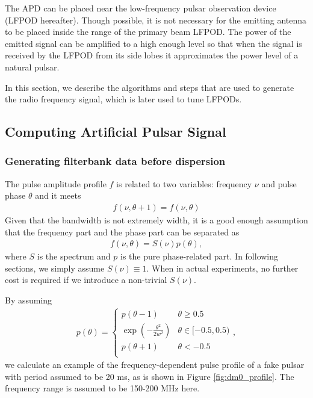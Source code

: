 \documentclass[fleqn,usenatbib]{mnras}
\begin{document}
The APD can be placed near the low-frequency pulsar observation device (LFPOD hereafter). 
Though possible, it is not necessary for the emitting antenna to be placed inside the range of the primary beam LFPOD.
The power of the emitted signal can be amplified to a high enough level so that when the signal is received by the LFPOD from its side lobes it approximates the power level of a natural pulsar.

In this section, we describe the algorithms and steps that are used to generate the radio frequency signal, which is later used to tune LFPODs.

\subsection{Computing Artificial Pulsar Signal}
\subsubsection{Generating filterbank data before dispersion}
The pulse amplitude profile $f$ is related to two variables: frequency $\nu$ and pulse phase $\theta$ and it meets
\begin{gather}
    f(\nu, \theta+1)=f(\nu, \theta)
\end{gather}
Given that the bandwidth is not extremely width, it is a good enough assumption that the frequency part and the phase part can be separated as
\begin{gather}
    f(\nu,\theta)=S(\nu)p(\theta),
\end{gather}
where $S$ is the spectrum and $p$ is the pure phase-related part.
In following sections, we simply assume $S(\nu)\equiv 1$. 
When in actual experiments, no further cost is required if we introduce a non-trivial $S(\nu)$.

By assuming 
\begin{gather}
    p(\theta)=\left \{
    \begin{array}{rl}
        p(\theta-1) &\theta \geq 0.5\\
         \exp(-\frac{\theta^2}{2w^2}) & \theta\in[-0.5, 0.5) \\
        p(\theta+1) &\theta < -0.5\\
    \end{array}
    \right ., 
\end{gather}
we calculate an example of the frequency-dependent pulse profile of a fake pulsar with period assumed to be 20 ms, as is shown in Figure \ref{fig:dm0_profile}. The frequency range is assumed to be 150-200 MHz here.
\end{document}
